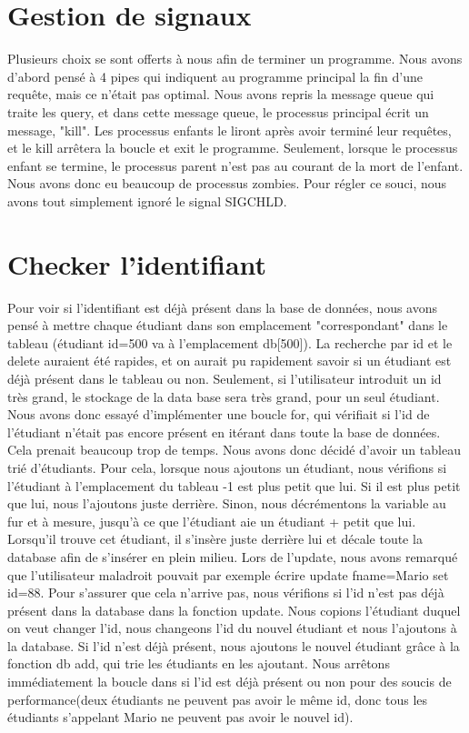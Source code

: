 \documentclass[utf8]{article}
\begin{document}
\section{Gestion de signaux}
\indent{}
\par
Plusieurs choix se sont offerts à nous afin de terminer un programme. Nous avons d'abord pensé à 4 pipes qui indiquent au programme principal 
la fin d'une requête, mais ce n'était pas optimal.
Nous avons repris la message queue qui traite les query, et dans 
cette message queue, le processus principal écrit un message, "kill". Les processus enfants le liront après avoir terminé leur requêtes,
et le kill arrêtera la boucle et exit le programme.
Seulement, lorsque le processus enfant se termine, le processus parent n'est pas au courant de la mort de l'enfant. Nous avons donc eu 
beaucoup de processus zombies. Pour régler ce souci, nous avons tout simplement ignoré le signal SIGCHLD.


\section{Checker l'identifiant}
\indent{}
\par
Pour voir si l'identifiant est déjà présent dans la base de données, nous avons pensé à mettre chaque étudiant
dans son emplacement "correspondant" dans le tableau (étudiant id=500 va à l'emplacement db[500]). La recherche par id et le delete auraient été rapides, et on 
aurait pu rapidement savoir si un étudiant est déjà présent dans le tableau ou non.
Seulement, si l'utilisateur introduit un id très grand, le stockage de la data base sera très grand, pour un seul étudiant.
Nous avons donc essayé d'implémenter une boucle for, qui vérifiait si l'id de l'étudiant n'était pas encore présent en itérant dans toute la base de données.
Cela prenait beaucoup trop de temps. Nous avons donc décidé d'avoir un tableau trié d'étudiants. Pour cela, lorsque nous ajoutons un étudiant,
nous vérifions si l'étudiant à l'emplacement du tableau -1 est plus petit que lui. Si il est plus petit que lui, nous l'ajoutons juste derrière. Sinon, 
nous décrémentons la variable au fur et à mesure, jusqu'à ce que l'étudiant aie un étudiant + petit que lui. Lorsqu'il trouve cet étudiant, il s'insère juste derrière lui
et décale toute la database afin de s'insérer en plein milieu.
Lors de l'update, nous avons remarqué que l'utilisateur maladroit pouvait par exemple écrire update fname=Mario set id=88.
Pour s'assurer que cela n'arrive pas, nous vérifions si l'id n'est pas déjà présent dans la database dans la fonction update.
Nous copions l'étudiant duquel on veut changer l'id, nous changeons l'id du nouvel étudiant et nous l'ajoutons à la database. Si l'id 
n'est déjà présent, nous ajoutons le nouvel étudiant grâce à la fonction db add, qui trie les étudiants en les ajoutant.
Nous arrêtons immédiatement la boucle dans si l'id est déjà présent ou non pour des soucis de performance(deux étudiants ne peuvent pas avoir le même id, 
donc tous les étudiants s'appelant Mario ne peuvent pas avoir le nouvel id). 
\par
\end{document}
